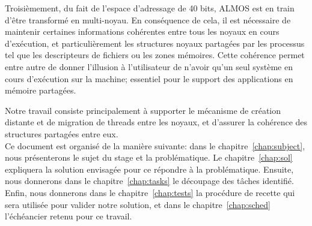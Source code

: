   Troisièmement, du fait de l'espace d'adressage de 40 bits, ALMOS est en train
  d'être transformé en multi-noyau. En conséquence de cela, il est nécessaire de
  maintenir certaines informations cohérentes entre tous les noyaux en cours
  d'exécution, et particulièrement les structures noyaux partagées par les
  processus tel que les descripteurs de fichiers ou les zones mémoires. Cette
  cohérence permet entre autre de donner l'illusion à l'utilisateur de n'avoir
  qu'un seul système en cours d'exécution sur la machine; essentiel pour le
  support des applications en mémoire partagées.

  Notre travail consiste principalement à supporter le mécanisme de création
  distante et de migration de threads entre les noyaux, et d'assurer la
  cohérence des structures partagées entre eux.\\

  Ce document est organisé de la manière suivante: dans le
  chapitre~\ref{chap:subject}, nous présenterons le sujet du stage et la
  problématique. Le chapitre~\ref{chap:sol} expliquera la solution envisagée
  pour ce répondre à la problématique. Ensuite, nous donnerons dans le
  chapitre~\ref{chap:tasks} le découpage des tâches identifié. Enfin, nous
  donnerons dans le chapitre~\ref{chap:tests} la procédure de recette qui sera
  utilisée pour valider notre solution, et dans le chapitre~\ref{chap:sched}
  l'échéancier retenu pour ce travail.
